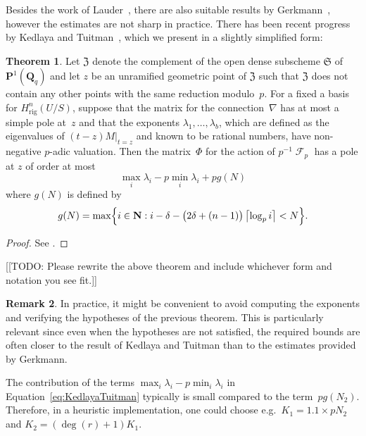 \documentclass[a4paper,11pt]{article}
\numberwithin{equation}{section}
\providecommand{\ceil}[1]{\left\lceil#1\right\rceil}   %
\DeclareMathOperator{\Frob}{\mathcal{F}} %
\providecommand{\Hrig}{H_{\text{rig}}}  %
\theoremstyle{definition}
\newtheorem{thm}{Theorem}[section]
\newtheorem{rem}[thm]{Remark}
\begin{document}
Besides the work of Lauder~\citep[\S 8.1]{Lauder2004a}, there are also 
suitable results by Gerkmann~\citep[\S 6]{Gerkmann2007}, however the 
estimates are not sharp in practice.  There has been recent progress by 
Kedlaya and Tuitman~\citep[Theorem~2.1]{KedlayaTuitman2012}, which we 
present in a slightly simplified form:

\begin{thm} \label{thm:KedlayaTuitman}
Let $\mathfrak{Z}$ denote the complement of the open dense 
subscheme $\mathfrak{S}$ of $\mathbf{P}^{1}(\mathbf{Q}_q)$ 
and let $z$ be an unramified geometric point of $\mathfrak{Z}$ 
such that $\mathfrak{Z}$ does not contain any other points 
with the same reduction modulo~$p$.  For a fixed a basis for 
$\Hrig^n(U/S)$, suppose that the matrix 
for the connection~$\nabla$ has at most a simple pole at~$z$ 
and that the exponents $\lambda_1, \dotsc, \lambda_{b}$, 
which are defined as the eigenvalues of $(t - z) M \vert_{t=z}$ 
and known to be rational numbers, have non-negative $p$-adic 
valuation.  Then the matrix~$\Phi$ for the action of $p^{-1} \Frob_p$ 
has a pole at $z$ of order at most 
\begin{equation} \label{eq:KedlayaTuitman}
\max_{i} \lambda_i - p \min_{i} \lambda_i + p g(N)
\end{equation}
where $g(N)$ is defined by 
\begin{equation}
g(N) = \max\Bigl\{ i \in \mathbf{N} : i - \delta - \bigl(2\delta + (n-1)\bigr) \ceil{\log_p i} < N \Bigr\}.
\end{equation}
\end{thm}

\begin{proof}
See \citep[Theorem~2.1]{KedlayaTuitman2012}.
\end{proof}

[[TODO:  Please rewrite the above theorem and include whichever 
form and notation you see fit.]]

\begin{rem} \label{rem:KedlayaTuitman}
In practice, it might be convenient to avoid computing the exponents and 
verifying the hypotheses of the previous theorem.  This is particularly 
relevant since even when the hypotheses are not satisfied, the required 
bounds are often closer to the result of Kedlaya and Tuitman than to the 
estimates provided by Gerkmann.

The contribution of the terms $\max_i \lambda_i - p \min_i \lambda_i$ 
in Equation~\eqref{eq:KedlayaTuitman} typically is small compared to the 
term~$p g(N_2)$. Therefore, in a heuristic implementation, one 
could choose e.g.\ $K_1 = 1.1 \times p N_2$ and $K_2 = (\deg(r) + 1) K_1$.
\end{rem}
\end{document}

